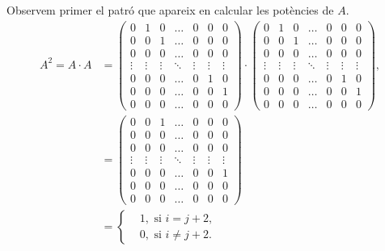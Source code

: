 \begin{solution}
   Observem primer el patró que apareix en calcular les potències de $A$.
   \begin{align} A^{2} = A\cdot A &= 
    \begin{pmatrix} 0 & 1 & 0 &\hdots&0 &0 &0 \\ 
        0 & 0 &1 &\hdots &0 &0 &0 \\ 
        0 & 0 &0 &\hdots &0 &0 &0 \\ 
        \vdots & \vdots &\vdots &\ddots &\vdots &\vdots &\vdots \\ 
        0 & 0 & 0 &\hdots & 0&1 &0 \\ 0 & 0 & 0 &\hdots & 0&0 &1 \\ 
        0 & 0 &0 &\hdots &0 &0 &0 
    \end{pmatrix}\cdot 
    \begin{pmatrix} 
        0 & 1 & 0 &\hdots&0 &0 &0 \\ 
        0 & 0 &1 &\hdots &0 &0 &0 \\ 
        0 & 0 &0 &\hdots &0 &0 &0 \\ 
        \vdots & \vdots &\vdots &\ddots &\vdots &\vdots &\vdots \\ 
        0 & 0 & 0 &\hdots & 0&1 &0 \\ 
        0 & 0 & 0 &\hdots & 0&0 &1 \\ 
        0 & 0 &0 &\hdots &0 &0 &0 
    \end{pmatrix},\\ 
    &=\begin{pmatrix} 
        0 & 0 & 1 &\hdots&0 &0 &0 \\ 
        0 & 0 &0 &\hdots &0 &0 &0 \\ 
        0 & 0 &0 &\hdots &0 &0 &0 \\ 
        \vdots & \vdots &\vdots &\ddots &\vdots &\vdots &\vdots \\ 
        0 & 0 & 0 &\hdots & 0&0 &1 \\ 
        0 & 0 & 0 &\hdots & 0&0 &0 \\ 
        0 & 0 &0 &\hdots &0 &0 &0 \end{pmatrix}\\ 
        &= \left\{ \begin{aligned} 
            &1, \text{ si } i = j+2,\\ 
            &0, \text{ si } i \neq j+2. 
        \end{aligned}\right. 
    \end{align}


\end{solution}
